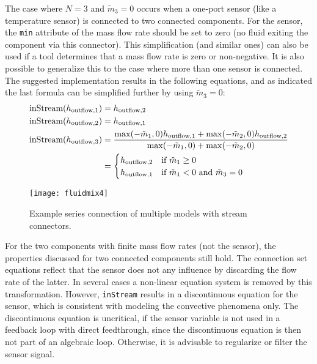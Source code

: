 The case where $N=3$ and $\tilde{m}_3=0$ occurs when a one-port sensor (like a temperature sensor) is connected to two connected components.
For the sensor, the \lstinline!min! attribute of the mass flow rate should be set to zero (no fluid exiting the component via this connector).
This simplification (and similar ones) can also be used if a tool determines that a mass flow rate is zero or non-negative.
It is also possible to generalize this to the case where more than one sensor is connected.
The suggested implementation results in the following equations, and as indicated the last formula can be simplified further by using $\tilde{m}_3=0$:
\begin{align*}
\text{\lstinline!inStream!}(h_{\mathrm{outflow},1}) &= h_{\mathrm{outflow},2}\\
\text{\lstinline!inStream!}(h_{\mathrm{outflow},2}) &= h_{\mathrm{outflow},1}\\
\text{\lstinline!inStream!}(h_{\mathrm{outflow},3}) &= \frac{\operatorname{max}(-\tilde{m}_1,0)h_{\mathrm{outflow},1}+\operatorname{max}(-\tilde{m}_2,0)h_{\mathrm{outflow},2}}{\operatorname{max}(-\tilde{m}_1,0)+\operatorname{max}(-\tilde{m}_2,0)}\\
&=
\begin{cases}
h_{\mathrm{outflow},2}&\text{if $\tilde{m}_1 \geq 0$}\\
h_{\mathrm{outflow},1}&\text{if $\tilde{m}_1 < 0$ and $\tilde{m}_3 = 0$}
\end{cases}
\end{align*}
\begin{figure}[H]
  \begin{center}
    \texttt{[image: fluidmix4]}
  \end{center}
  \caption{Example series connection of multiple models with stream connectors.}
\end{figure}

For the two components with finite mass flow rates (not the sensor), the
properties discussed for two connected components still hold. The
connection set equations reflect that the sensor does not any influence
by discarding the flow rate of the latter. In several cases a non-linear
equation system is removed by this transformation. However, \lstinline!inStream!
results in a discontinuous equation for the sensor, which is consistent
with modeling the convective phenomena only. The discontinuous equation
is uncritical, if the sensor variable is not used in a feedback loop
with direct feedthrough, since the discontinuous equation is then not
part of an algebraic loop. Otherwise, it is advisable to regularize or
filter the sensor signal.

